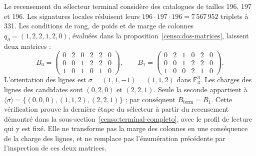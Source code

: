 Le recensement du sélecteur terminal considère des catalogues
de tailles 196, 197 et 196. Les signatures locales réduisent leurs
\(196\cdot197\cdot196=7\,567\,952\) triplets à 331. Les conditions de rang,
de poids et de marge de colonnes \(q_{\partial}=(1,2,2,1,2,0)\),
évaluées dans la proposition~\ref{censo:dos-matrices}, laissent deux matrices :
\[
 B_0=\begin{pmatrix}0&2&0&2&2&0\\0&0&1&2&2&0\\1&0&1&0&1&0\end{pmatrix},
 \qquad
 B_1=\begin{pmatrix}0&2&1&0&2&0\\0&0&1&2&2&0\\1&0&0&2&1&0\end{pmatrix}.
\]
L’orientation des lignes est \(\sigma=(1,1,-1)=(1,1,2)\) dans
\(\mathbb F_3^3\). Les charges des lignes des candidates sont
\((0,2,0)\) et \((2,2,1)\). Seule la seconde appartient à
\(\langle\sigma\rangle=\{(0,0,0),(1,1,2),(2,2,1)\}\) ; par conséquent
\(B_{\mathrm{term}}=B_1\). Cette vérification prouve la dernière étape du
sélecteur à partir du recensement démontré dans la
sous-section~\ref{censo:terminal-completo}, avec le profil de lecture qui y est fixé.
Elle ne transforme pas la marge des colonnes
en une conséquence de la charge des lignes, et ne remplace pas l’énumération
précédente par l’inspection de ces deux matrices.

